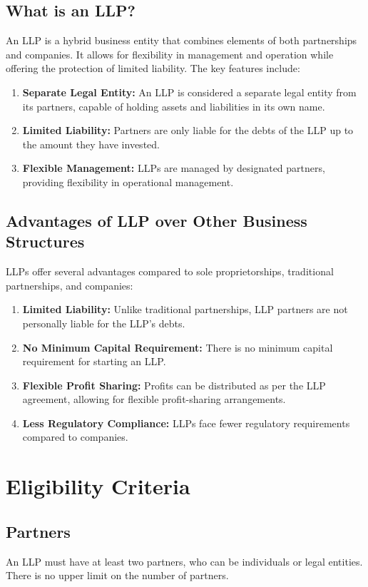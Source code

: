 \documentclass[a4paper,12pt]{report}
\begin{document}
\section{What is an LLP?}
An LLP is a hybrid business entity that combines elements of both partnerships and companies. It allows for flexibility in management and operation while offering the protection of limited liability. The key features include:
\begin{enumerate}
    \item \textbf{Separate Legal Entity:} An LLP is considered a separate legal entity from its partners, capable of holding assets and liabilities in its own name.
    \item \textbf{Limited Liability:} Partners are only liable for the debts of the LLP up to the amount they have invested.
    \item \textbf{Flexible Management:} LLPs are managed by designated partners, providing flexibility in operational management.
\end{enumerate}

\section{Advantages of LLP over Other Business Structures}
LLPs offer several advantages compared to sole proprietorships, traditional partnerships, and companies:
\begin{enumerate}
    \item \textbf{Limited Liability:} Unlike traditional partnerships, LLP partners are not personally liable for the LLP's debts.
    \item \textbf{No Minimum Capital Requirement:} There is no minimum capital requirement for starting an LLP.
    \item \textbf{Flexible Profit Sharing:} Profits can be distributed as per the LLP agreement, allowing for flexible profit-sharing arrangements.
    \item \textbf{Less Regulatory Compliance:} LLPs face fewer regulatory requirements compared to companies.
\end{enumerate}

\chapter{Eligibility Criteria}
\section{Partners}
An LLP must have at least two partners, who can be individuals or legal entities. There is no upper limit on the number of partners.
\end{document}
